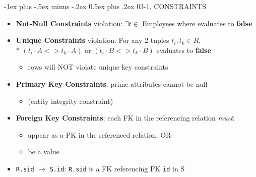 \documentclass[10pt, landscape]{article}
\makeatletter
\renewcommand{\section}{\@startsection{section}{1}{0mm}%
  {-1ex plus -.5ex minus -.2ex}%
  {0.5ex plus .2ex}%
{\normalfont\large\bfseries}}
\makeatother
\begin{document}
\begin{multicols*}{4}
  \section{03-1. CONSTRAINTS}
  \begin{itemize}
    \item \textbf{Not-Null Constraints} violation: $\exists t \in$ Employees where  evaluates to \textbf{false}
    \item \textbf{Unique Constraints} violation: For any 2 tuples $t_i, t_k \in R$, \\*
      $(t_i\cdot A <> t_k\cdot A)$ or  $(t_i\cdot B <> t_k \cdot B)$ evaluates to  \textbf{false}
      \begin{itemize}
        \item \attention {} rows will NOT violate unique key constraints
      \end{itemize}
    \item \textbf{Primary Key Constraints}: prime attributes cannot be null
      \begin{itemize}
        \item (entity integrity constraint)
      \end{itemize}
    \item \textbf{Foreign Key Constraints}: each FK in the referencing relation \textit{must}:
      \begin{itemize}
        \item appear as a PK in the referenced relation, OR 
        \item be a  value
      \end{itemize}
    \item \texttt{R.sid} $\rightarrow$ \texttt{S.id}: \texttt{R.sid} is a FK referencing PK \texttt{id} in S
  \end{itemize}


\end{multicols*}
\end{document}
